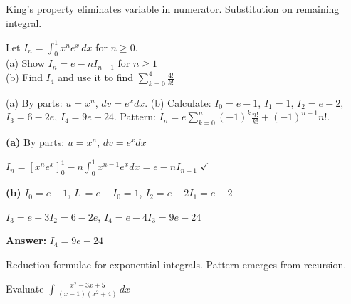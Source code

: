 \begin{takeaways}
King's property eliminates variable in numerator. Substitution on remaining integral.
\end{takeaways}

\vspace{1cm}

\begin{problem}
Let $I_n = \displaystyle \int_0^1 x^n e^x \, dx$ for $n \geq 0$.\\
(a) Show $I_n = e - nI_{n-1}$ for $n \geq 1$\\
(b) Find $I_4$ and use it to find $\displaystyle \sum_{k=0}^{4} \frac{4!}{k!}$
\end{problem}

\begin{hint}
(a) By parts: $u = x^n$, $dv = e^x dx$. (b) Calculate: $I_0 = e-1$, $I_1 = 1$, $I_2 = e-2$, $I_3 = 6-2e$, $I_4 = 9e - 24$. Pattern: $I_n = e\sum_{k=0}^{n}(-1)^k\frac{n!}{k!} + (-1)^{n+1}n!$.
\end{hint}

\begin{solution}
\textbf{(a)} By parts: $u=x^n$, $dv=e^xdx$

$I_n = [x^ne^x]_0^1 - n\int_0^1 x^{n-1}e^xdx = e - nI_{n-1}$ $\checkmark$

\textbf{(b)} $I_0=e-1$, $I_1=e-I_0=1$, $I_2=e-2I_1=e-2$

$I_3=e-3I_2=6-2e$, $I_4=e-4I_3=9e-24$

\textbf{Answer:} $\boxed{I_4 = 9e-24}$
\end{solution}

\begin{takeaways}
Reduction formulae for exponential integrals. Pattern emerges from recursion.
\end{takeaways}

\vspace{1cm}%
\begin{problem}
Evaluate $\displaystyle \int \frac{x^2 - 3x + 5}{(x-1)(x^2 + 4)} \, dx$
\end{problem}

